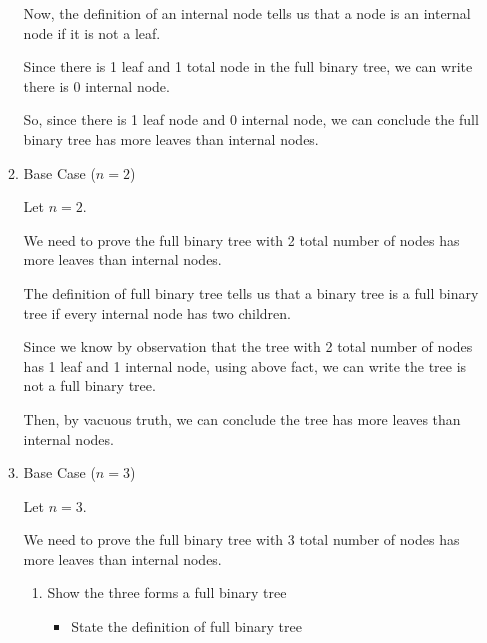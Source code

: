 \documentclass[12pt]{article}
\begin{document}
\begin{itemize}
\begin{mdframed}
\begin{enumerate}[1.]
\begin{mdframed}
            Now, the definition of an internal node tells us that a node is
            an internal node if it is not a leaf.

            \bigskip

            Since there is 1 leaf and 1 total node in the full binary tree,
            we can write there is 0 internal node.

            \bigskip

            So, since there is 1 leaf node and 0 internal node, we can
            conclude the full binary tree has more leaves than internal nodes.

            \end{mdframed}

            \item Base Case ($n = 2$)

            \begin{mdframed}

            Let $n = 2$.

            \bigskip

            We need to prove the full binary tree with 2 total number of nodes
            has more leaves than internal nodes.

            \bigskip

            The definition of full binary tree tells us that a binary tree is a full
            binary tree if every internal node has two children.

            \bigskip

            Since we know by observation that the tree with 2 total number of nodes
            has 1 leaf and 1 internal node, using above fact, we can write the
            tree is not a full binary tree.

            \bigskip

            Then, by vacuous truth, we can conclude the tree has more leaves than
            internal nodes.
            \end{mdframed}

            \item Base Case ($n = 3$)

            Let $n = 3$.

            \bigskip

            We need to prove the full binary tree with 3 total number of nodes
            has more leaves than internal nodes.

            \begin{enumerate}[1.]
                \item Show the three forms a full binary tree
                \begin{itemize}
                    \item State the definition of full binary tree


\end{itemize}
\end{enumerate}
\end{enumerate}
\end{mdframed}
\end{itemize}
\end{document}
